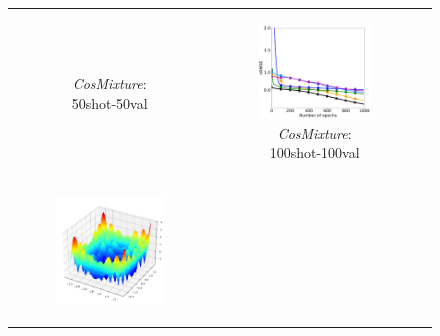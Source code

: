 \begin{figure}[t]
\begin{tabular}[c]{ccc}
\begin{subfigure}[t]{0.32\textwidth}
			\caption{\small \textit{CosMixture}: 50shot-50val}
		\end{subfigure} 
		&
		\begin{subfigure}[t]{0.32\textwidth}
			\centering
			\includegraphics[width=\textwidth]{./figs/new/CosMixture2D-100shot-100query-500inners-eps-converted-to.pdf}
			\caption{\small \textit{CosMixture}: 100shot-100val}
		\end{subfigure} 	\\
		\begin{subfigure}[t]{0.32\textwidth}
			\centering
			\includegraphics[width=\textwidth]{./figs/Alpine2D.pdf}

\end{subfigure}
\end{tabular}
\end{figure}
